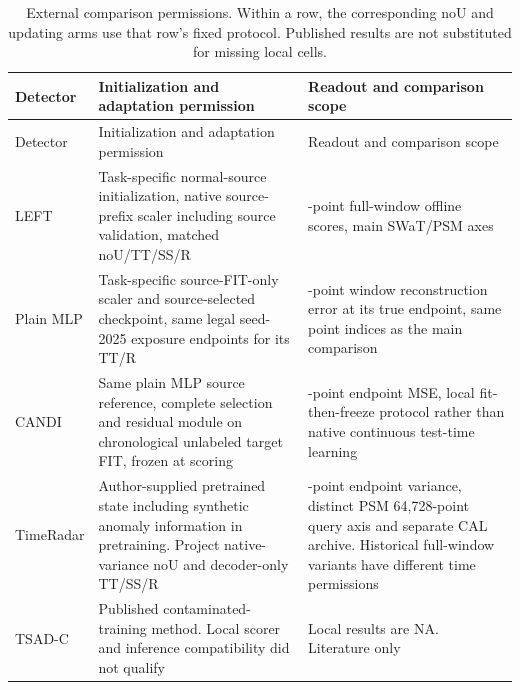 \documentclass[pdflatex,sn-apa]{sn-jnl}
\begin{document}
\begin{longtable}[]{@{}
  >{\raggedright\arraybackslash}p{}
  >{\raggedright\arraybackslash}p{}
  >{\raggedright\arraybackslash}p{}@{}}
\caption{External comparison permissions. Within a row, the
corresponding noU and updating arms use that row's fixed protocol.
Published results are not substituted for missing local
cells.}\tabularnewline
\toprule\noalign{}
\begin{minipage}[b]{\linewidth}\raggedright
Detector
\end{minipage} & \begin{minipage}[b]{\linewidth}\raggedright
Initialization and adaptation permission
\end{minipage} & \begin{minipage}[b]{\linewidth}\raggedright
Readout and comparison scope
\end{minipage} \\
\midrule\noalign{}
\endfirsthead
\toprule\noalign{}
\begin{minipage}[b]{\linewidth}\raggedright
Detector
\end{minipage} & \begin{minipage}[b]{\linewidth}\raggedright
Initialization and adaptation permission
\end{minipage} & \begin{minipage}[b]{\linewidth}\raggedright
Readout and comparison scope
\end{minipage} \\
\midrule\noalign{}
\endhead
\bottomrule\noalign{}
\endlastfoot
LEFT & Task-specific normal-source initialization, native source-prefix
scaler including source validation, matched noU/TT/SS/R & 192-point
full-window offline scores, main SWaT/PSM axes \\
Plain MLP & Task-specific source-FIT-only scaler and source-selected
checkpoint, same legal seed-2025 exposure endpoints for its TT/R &
10-point window reconstruction error at its true endpoint, same point
indices as the main comparison \\
CANDI & Same plain MLP source reference, complete selection and residual
module on chronological unlabeled target FIT, frozen at scoring &
10-point endpoint MSE, local fit-then-freeze protocol rather than native
continuous test-time learning \\
TimeRadar & Author-supplied pretrained state including synthetic anomaly
information in pretraining. Project native-variance noU and decoder-only
TT/SS/R & 100-point endpoint variance, distinct PSM 64,728-point query
axis and separate CAL archive. Historical full-window variants have
different time permissions \\
TSAD-C & Published contaminated-training method. Local scorer and
inference compatibility did not qualify & Local results are NA.
Literature only \\
\end{longtable}
\end{document}
